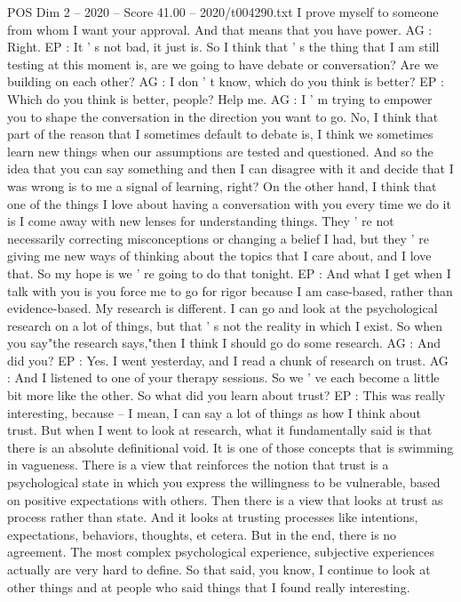 \begin{textsample}{POS Dim 2 – 2020 – Score 41.00 – 2020/t004290.txt}
I prove myself to someone from whom I want your approval.
And that means that you have power.
AG : Right.
EP : It ' s not bad, it just is.
So I think that ' s the thing that I am still testing at this moment is, are we going to have debate or conversation?
Are we building on each other?
AG : I don ' t know, which do you think is better?
EP : Which do you think is better, people?
Help me.
AG : I ' m trying to empower you to shape the conversation in the direction you want to go.
No, I think that part of the reason that I sometimes default to debate is, I think we sometimes learn new things when our assumptions are tested and questioned.
And so the idea that you can say something and then I can disagree with it and decide that I was wrong is to me a signal of learning, right?
On the other hand, I think that one of the things I love about having a conversation with you every time we do it is I come away with new lenses for understanding things.
They ' re not necessarily correcting misconceptions or changing a belief I had, but they ' re giving me new ways of thinking about the topics that I care about, and I love that.
So my hope is we ' re going to do that tonight.
EP : And what I get when I talk with you is you force me to go for rigor because I am case-based, rather than evidence-based.
My research is different.
I can go and look at the psychological research on a lot of things, but that ' s not the reality in which I exist.
So when you say"the research says,"then I think I should go do some research.
AG : And did you?
EP : Yes.
I went yesterday, and I read a chunk of research on trust.
AG : And I listened to one of your therapy sessions.
So we ' ve each become a little bit more like the other.
So what did you learn about trust?
EP : This was really interesting, because -- I mean, I can say a lot of things as how I think about trust.
But when I went to look at research, what it fundamentally said is that there is an absolute definitional void.
It is one of those concepts that is swimming in vagueness.
There is a view that reinforces the notion that trust is a psychological state in which you express the willingness to be vulnerable, based on positive expectations with others.
Then there is a view that looks at trust as process rather than state.
And it looks at trusting processes like intentions, expectations, behaviors, thoughts, et cetera.
But in the end, there is no agreement.
The most complex psychological experience, subjective experiences actually are very hard to define.
So that said, you know, I continue to look at other things and at people who said things that I found really interesting.

\end{textsample}
